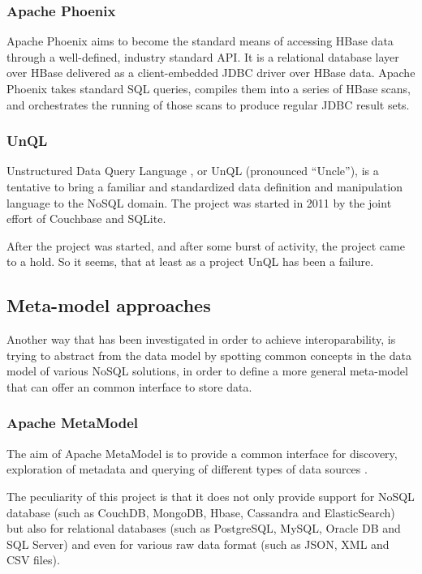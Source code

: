 \subsubsection{Apache Phoenix} 
Apache Phoenix \cite{online:apache-phoenix} aims to become the standard means of accessing HBase data through a well-defined, industry standard API.
It is a relational database layer over HBase delivered as a client-embedded JDBC driver over HBase data. Apache Phoenix takes standard SQL queries, compiles them into a series of HBase scans, and orchestrates the running of those scans to produce regular JDBC result sets. 

\subsubsection{UnQL}  
Unstructured Data Query Language \cite{online:unql}, or UnQL (pronounced “Uncle”), is a tentative to bring a familiar and standardized data definition and manipulation language to the NoSQL domain. The project was started in 2011 by the joint effort of Couchbase and SQLite.

\noindent After the project was started, and after some burst of activity, the project came to a hold. So it seems, that at least as a project UnQL has been a failure. 

\subsection{Meta-model approaches}
Another way that has been investigated in order to achieve interoparability,  is trying to abstract from the data model by spotting common concepts in the data model of various NoSQL solutions, in order to define a more general meta-model that can offer an common interface to store data.

\subsubsection{Apache MetaModel}
The aim of Apache MetaModel is to provide a common interface for discovery, exploration of metadata and querying of different types of data sources \cite{online:apache-metamodel}.

\noindent The peculiarity of this project is that it does not only provide support for NoSQL database (such as CouchDB, MongoDB, Hbase, Cassandra and ElasticSearch) but also for relational databases (such as PostgreSQL, MySQL, Oracle DB and SQL Server) and even for various raw data format (such as JSON, XML and CSV files).
 
